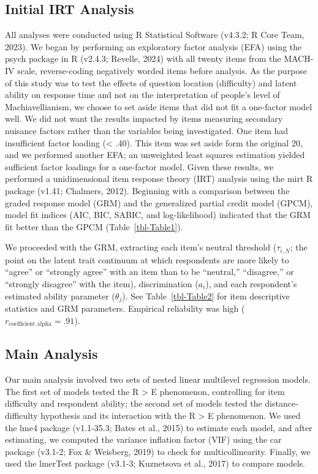 \documentclass[
  number]{elsarticle}
\begin{document}
\subsection{Initial IRT Analysis}\label{initial-irt-analysis}

All analyses were conducted using R Statistical Software (v4.3.2; R Core
Team, 2023). We began by performing an exploratory factor analysis (EFA)
using the psych package in R (v2.4.3; Revelle, 2024) with all twenty
items from the MACH-IV scale, reverse-coding negatively worded items
before analysis. As the purpose of this study was to test the effects of
question location (difficulty) and latent ability on response time and
not on the interpretation of people's level of Machiavellianism, we
choose to set aside items that did not fit a one-factor model well. We
did not want the results impacted by items measuring secondary nuisance
factors rather than the variables being investigated. One item had
insufficient factor loading (\textless{} .40). This item was set aside
form the original 20, and we performed another EFA; an unweighted least
squares estimation yielded sufficient factor loadings for a one-factor
model. Given these results, we performed a unidimensional item response
theory (IRT) analysis using the mirt R package (v1.41; Chalmers, 2012).
Beginning with a comparison between the graded response model (GRM) and
the generalized partial credit model (GPCM), model fit indices (AIC,
BIC, SABIC, and log-likelihood) indicated that the GRM fit better than
the GPCM (Table~\ref{tbl-Table1}).

We proceeded with the GRM, extracting each item's neutral threshold
(\(\tau_{i,N}\); the point on the latent trait continuum at which
respondents are more likely to ``agree'' or ``strongly agree'' with an
item than to be ``neutral,'' ``disagree,'' or ``strongly disagree'' with
the item), discrimination (\(a_i\)), and each respondent's estimated
ability parameter (\(\theta_j\)). See Table~\ref{tbl-Table2} for item
descriptive statistics and GRM parameters. Empirical reliability was
high (\(r_{\text{coefficient alpha}} = .91\)).

\subsection{Main Analysis}\label{main-analysis}

Our main analysis involved two sets of nested linear multilevel
regression models. The first set of models tested the R \textgreater{} E
phenomenon, controlling for item difficulty and respondent ability; the
second set of models tested the distance-difficulty hypothesis and its
interaction with the R \textgreater{} E phenomenon. We used the lme4
package (v1.1-35.3; Bates et al., 2015) to estimate each model, and
after estimating, we computed the variance inflation factor (VIF) using
the car package (v3.1-2; Fox \& Weisberg, 2019) to check for
multicollinearity. Finally, we used the lmerTest package (v3.1-3;
Kuznetsova et al., 2017) to compare models.
\end{document}

